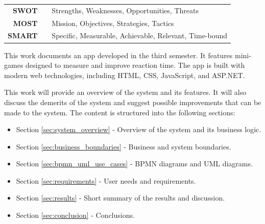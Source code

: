 \documentclass[]{VUMIFTemplateClass}
\begin{document}

\begin{tabular}{rcp{}}
    {\textbf{SWOT}} & {} & {Strengths, Weaknesses, Opportunities, Threats} \\
    {\textbf{MOST}} & {} & {Mission, Objectives, Strategies, Tactics} \\
    {\textbf{SMART}} & {} & {Specific, Measurable, Achievable, Relevant, Time-bound} \\
\end{tabular}

\label{sec:introduction}
This work documents an app developed in the third semester. It features mini-games designed to measure and improve reaction time. The app is built with modern web technologies, including HTML, CSS, JavaScript, and ASP.NET.


This work will provide an overview of the system and its features. It will also discuss the demerits of the system and suggest possible improvements that can be made to the system.
The content is structured into the following sections: 
\begin{itemize}
    \item Section \ref{sec:system_overview} - Overview of the system and its business logic.
    \item Section \ref{sec:business_boundaries} - Business and system boundaries.
    \item Section \ref{sec:bpmn_uml_use_cases} - BPMN diagrams and UML diagrams.
    \item Section \ref{sec:requirements} - User needs and requirements.
    \item Section \ref{sec:results} - Short summary of the results and discussion.
    \item Section \ref{sec:conclusion} - Conclusions.
\end{itemize}

\pagebreak
\end{document}
